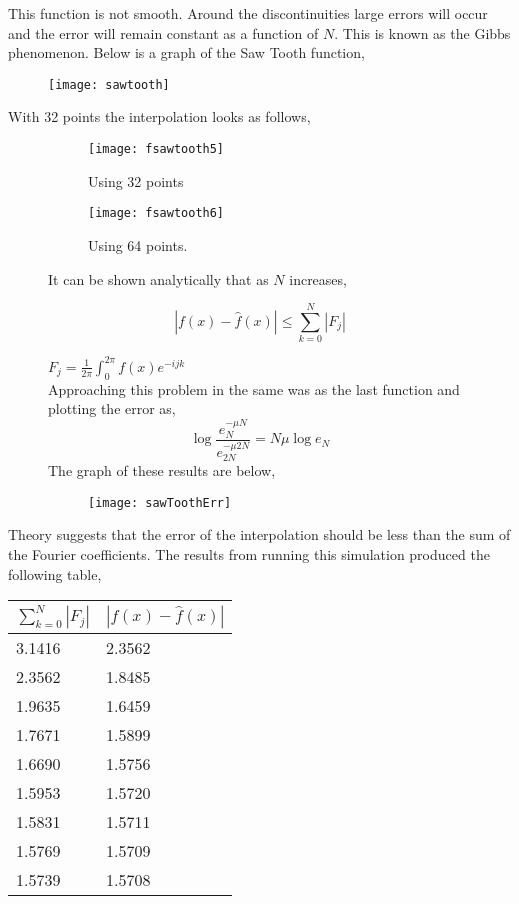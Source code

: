 \documentclass[]{article}
\begin{document}
This function is not smooth. Around the discontinuities large errors will occur and the error will remain constant as a function of $ N $. This is known as the Gibbs phenomenon. Below is a graph of the Saw Tooth function, 
\begin{figure}[H]
	\centering
	\texttt{[image: sawtooth]}
\end{figure}
With 32 points the interpolation looks as follows, 
\begin{figure}[H]
	\caption{Gibb's Phenomenon}
	\centering
	\begin{subfigure}{.3\textwidth}
	\texttt{[image: fsawtooth5]}
	\caption{Using 32 points}
	\end{subfigure}
	\begin{subfigure}{.4\textwidth}
		\texttt{[image: fsawtooth6]}
		\caption{Using 64 points. }
	\end{subfigure}

It can be shown analytically that as $ N $ increases, 

\[ 
|f(x) - \hat{f}(x) | \leq \sum_{k=0}^{N} |F_j|
 \]

$ F_j = \frac{1}{2\pi} \int_{0}^{2\pi} f(x)e ^{-ijk}  $ \\

Approaching this problem in the same was as the last function and plotting the error as, 
\[  
\log \frac{e_N^{-\mu N}}{e_{2N}^{-\mu 2N}} = N\mu \log e_N
\]
The graph of these results are below,  
\begin{figure}[H]
	\centering
	\texttt{[image: sawToothErr]}
\end{figure}
\end{figure}

Theory suggests that the error of the interpolation should be less than the sum of the Fourier coefficients. The results from running this simulation produced the following table, 
\begin{table}
	\centering
	\begin{tabular}{ll}
		$ \sum_{k=0}^{N} |F_j| $ & $ |f(x) - \hat{f}(x) | $ \\
		\hline 
		3.1416 & 2.3562 \\
		2.3562 & 1.8485 \\
		1.9635 & 1.6459 \\
		1.7671 & 1.5899 \\
		1.6690 & 1.5756 \\
		1.5953 & 1.5720 \\
		1.5831 & 1.5711 \\
		1.5769 & 1.5709 \\
		1.5739 & 1.5708 \\
	\end{tabular}
\end{table}
	
\end{document}
